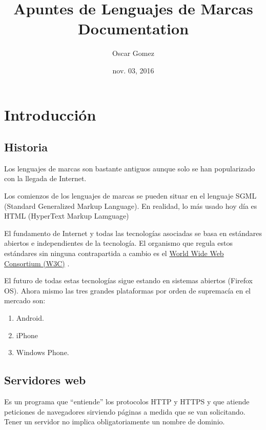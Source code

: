 \documentclass[letterpaper,10pt,spanish]{sphinxmanual}
\title{Apuntes de Lenguajes de Marcas Documentation}
\date{nov. 03, 2016}
\author{Oscar Gomez}
\begin{document}
\maketitle
\tableofcontents
{}\label{index::doc}



\chapter{Introducción}
\label{tema1:apuntes-de-lenguajes-de-marcas}\label{tema1:introduccion}\label{tema1::doc}

\section{Historia}
\label{tema1:historia}
Los lenguajes de marcas son bastante antiguos aunque solo se han popularizado con la llegada de Internet.

Los comienzos de los lenguajes de marcas se pueden situar en el lenguaje SGML (Standard Generalized Markup Language). En realidad, lo más usado hoy día es HTML (HyperText Markup Lamguage)

El fundamento de Internet y todas las tecnologías asociadas se basa en estándares abiertos e
independientes de la tecnología. El organismo que regula estos estándares sin ninguna contrapartida a cambio es el \href{http://www.w3c.org}{World Wide Web Consortium (W3C)} .

El futuro de todas estas tecnologías sigue estando en sistemas abiertos (Firefox OS). Ahora mismo las tres grandes plataformas por orden de supremacía en el mercado son:
\begin{enumerate}
\item {} 
Android.

\item {} 
iPhone

\item {} 
Windows Phone.

\end{enumerate}


\section{Servidores web}
\label{tema1:servidores-web}
Es un programa que “entiende” los protocolos HTTP y HTTPS y que atiende peticiones de navegadores
sirviendo páginas a medida que se van solicitando. Tener un servidor no implica obligatoriamente un nombre de dominio.
\end{document}
